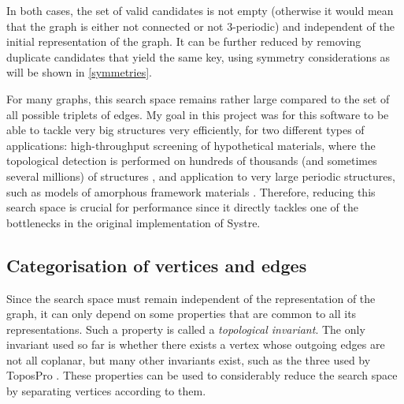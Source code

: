 \documentclass[main.tex]{subfiles}
\begin{document}
In both cases, the set of valid candidates is not empty (otherwise it would mean that the graph is either not connected or not 3-periodic) and independent of the initial representation of the graph. It can be further reduced by removing duplicate candidates that yield the same key, using symmetry considerations as will be shown in \cref{symmetries}.


For many graphs, this search space remains rather large compared to the set of all possible triplets of edges.  %
My goal in this project was for this software to be able to tackle very big structures very efficiently, for two different types of applications: high-throughput screening of hypothetical materials, where the topological detection is performed on hundreds of thousands (and sometimes several millions) of structures \autocite{ren2022highthroughput}, and application to very large periodic structures, such as models of amorphous framework materials \autocite{castel2022atomistic}. Therefore, reducing this search space is crucial for performance since it directly tackles one of the bottlenecks in the original implementation of Systre.

\subsection{Categorisation of vertices and edges}

Since the search space must remain independent of the representation of the graph, it can only depend on some properties that are common to all its representations. Such a property is called a \emph{topological invariant}. The only invariant used so far is whether there exists a vertex whose outgoing edges are not all coplanar, but many other invariants exist, such as the three used by ToposPro \autocite{ToposPro}. These properties can be used to considerably reduce the search space by separating vertices according to them.
\end{document}
